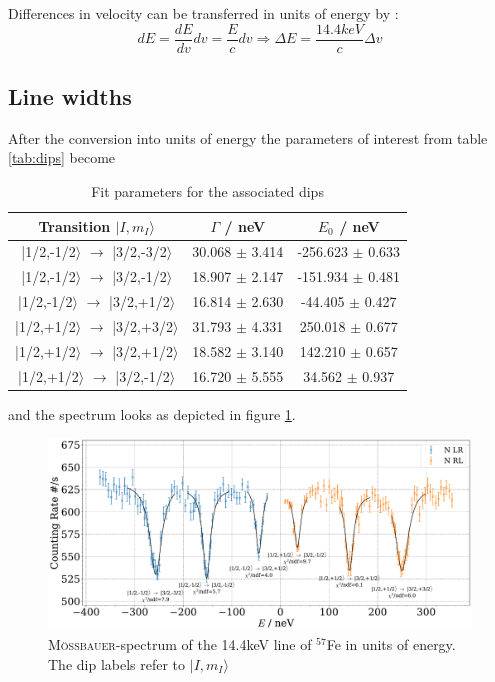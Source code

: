 \documentclass[11pt,a4paper,notitlepage]{scrartcl}
\begin{document}
Differences in velocity can be transferred in units of energy by \cite{chemistry}:
$$dE=\frac{dE}{dv} dv=\frac{E}{c}dv\Rightarrow \Delta E=\frac{14.4keV}{c}\Delta v$$

\subsection{Line widths}
After the conversion into units of energy the  parameters of interest from table \ref{tab:dips} become
\begin{table}[H]
	\centering
	\begin{tabular}{c|c|c}
		Transition $|I,m_I \rangle$ &$\Gamma$ / neV &$E_0$ / neV \\
		\hline
			|1/2,-1/2$\rangle$ $\rightarrow$ |3/2,-3/2$\rangle$& 30.068 $\pm$ 3.414 & -256.623 $\pm$ 0.633\\
			|1/2,-1/2$\rangle$ $\rightarrow$ |3/2,-1/2$\rangle$& 18.907 $\pm$ 2.147 & -151.934 $\pm$ 0.481\\
			|1/2,-1/2$\rangle$ $\rightarrow$ |3/2,+1/2$\rangle$& 16.814 $\pm$ 2.630 & -44.405 $\pm$ 0.427\\
			|1/2,+1/2$\rangle$ $\rightarrow$ |3/2,+3/2$\rangle$& 31.793 $\pm$ 4.331 & 250.018 $\pm$ 0.677\\
			|1/2,+1/2$\rangle$ $\rightarrow$ |3/2,+1/2$\rangle$ & 18.582 $\pm$ 3.140 & 142.210 $\pm$ 0.657\\
			|1/2,+1/2$\rangle$ $\rightarrow$ |3/2,-1/2$\rangle$& 16.720 $\pm$ 5.555 & 34.562 $\pm$ 0.937\\
		\hline
	\end{tabular}
	\caption{Fit parameters for the associated dips}\label{tab:dips_energy}
\end{table}
and the spectrum looks as depicted in figure  \ref{fig:mosbauer_energy}.
\begin{figure}[H]
	\centering
	\includegraphics[width=\linewidth]{figs/moesbauer_energy.pdf}
	\caption{\textsc{Mö\ss bauer}-spectrum of the 14.4keV line of $^{57}$Fe in units of energy. The dip labels refer to $|I,m_I \rangle$}\label{fig:mosbauer_energy}
\end{figure}
\end{document}
